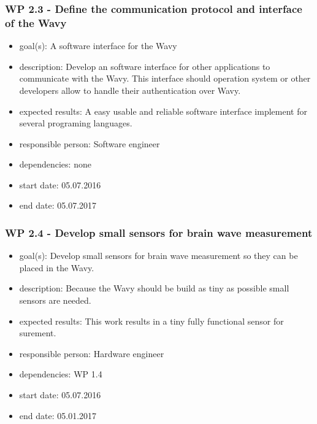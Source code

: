 \subsubsection*{WP 2.3 - Define the communication protocol and interface of the Wavy}
\begin{itemize}
 \item goal(s): A software interface for the Wavy
 \item description: Develop an software interface for other applications to communicate with the Wavy. This interface should operation system or other developers allow to handle their authentication over Wavy.
 \item expected results: A easy usable and reliable software interface implement for several programing languages.
 \item responsible person: Software engineer
 \item dependencies: none
 \item start date: 05.07.2016
 \item end date: 05.07.2017
\end{itemize}

\subsubsection*{WP 2.4 - Develop small sensors for brain wave measurement}
\begin{itemize}
 \item goal(s): Develop small sensors for brain wave measurement so they can be placed in the Wavy.
 \item description: Because the Wavy should be build as tiny as possible small sensors are needed.
 \item expected results: This work results in a tiny fully functional sensor for surement.
 \item responsible person: Hardware engineer
 \item dependencies: WP 1.4
 \item start date: 05.07.2016
 \item end date: 05.01.2017
\end{itemize}


